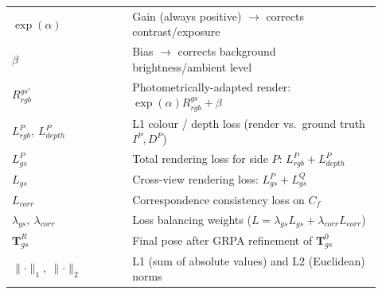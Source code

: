 \documentclass[11pt,a4paper]{article}
\begin{document}
\begin{center}
\begin{tabular}{@{}p{0.3\linewidth}p{0.62\linewidth}@{}}
$\exp(\alpha)$ & Gain (always positive) $\to$ corrects contrast/exposure \\
$\beta$ & Bias $\to$ corrects background brightness/ambient level \\
$R^{gs'}_{rgb}$ & Photometrically-adapted render: $\exp(\alpha)R^{gs}_{rgb}+\beta$ \\
\midrule
$L^P_{rgb},\ L^P_{depth}$ & L1 colour / depth loss (render vs.\ ground truth $I^P,D^P$) \\
$L^P_{gs}$ & Total rendering loss for side $P$: $L^P_{rgb}+L^P_{depth}$ \\
$L_{gs}$ & Cross-view rendering loss: $L^P_{gs}+L^Q_{gs}$ \\
$L_{corr}$ & Correspondence consistency loss on $C_f$ \\
$\lambda_{gs},\ \lambda_{corr}$ & Loss balancing weights ($L=\lambda_{gs}L_{gs}+\lambda_{corr}L_{corr}$) \\
$\mathbf{T}_{gs}^R$ & Final pose after GRPA refinement of $\mathbf{T}_{gs}^0$ \\
$\lVert\cdot\rVert_1,\ \lVert\cdot\rVert_2$ & L1 (sum of absolute values) and L2 (Euclidean) norms \\
\bottomrule
\end{tabular}
\end{center}
\end{document}
